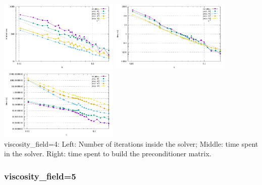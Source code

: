 \begin{center} 
\includegraphics[width=5.7cm]{python_codes/fieldstone_16/results/visc_field_4/niterations.pdf}
\includegraphics[width=5.7cm]{python_codes/fieldstone_16/results/visc_field_4/solve_time.pdf}
\includegraphics[width=5.7cm]{python_codes/fieldstone_16/results/visc_field_4/build_precond.pdf}\\
{\captionfont viscosity\_field=4: Left: Number of iterations inside the solver; 
Middle: time spent in the solver.
Right: time spent to build the preconditioner matrix.}
\end{center} 










\newpage
\subsubsection{viscosity\_field=5}

